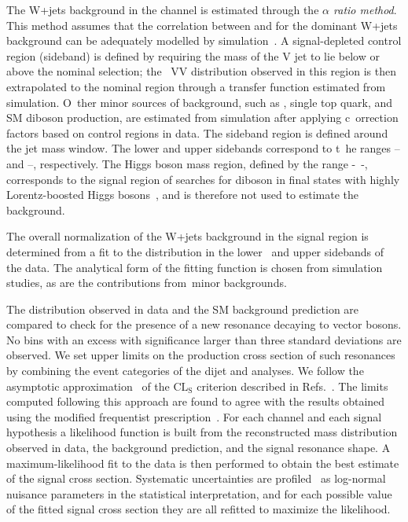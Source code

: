 The W+jets background in the \lnujet channel is estimated through the \emph{$\alpha$ ratio method}.
This method assumes that the correlation between \mJ{} and \mVV{} for the dominant W+jets background can be adequately modelled by simulation\
.
A signal-depleted control region (sideband) is defined by requiring the mass of the V jet to lie below or above the nominal selection; the \m\
VV{} distribution observed in this region is then extrapolated to the nominal region through a transfer function estimated from simulation. O\
ther minor sources of background, such as \ttbar, single top quark, and SM diboson production, are estimated from simulation after applying c\
orrection factors based on control regions in data. The sideband region is defined around the jet mass window. The lower and upper sidebands correspond to t\
he \mJ{} ranges \LOWSBLOW--\SRLOW and \HIGHSBLOW--\HIGHSBHIGH{\GeV}, respectively. The Higgs boson mass region, defined by the range \SRHIGH-\
-\HIGHSBLOW{\GeV}, corresponds to the signal region of searches for diboson in final states with highly Lorentz-boosted Higgs 
bosons~\cite{Khachatryan:2016cfx}, and is therefore not used to estimate the background.

\par The overall normalization of the W+jets background in the signal region is determined from a fit to the \mJ{} distribution in the lower \
and upper sidebands of the data. The analytical form of the fitting function is chosen from simulation studies, as are the contributions from\
 minor backgrounds. 

The \mVV{} distribution observed in data and the
SM background prediction are compared to check for the presence of a
new resonance decaying to vector bosons.
No bins with an excess with significance larger than three standard deviations are observed.
We set upper limits on the
production cross section of such resonances by combining the event categories of
the dijet and \lnujet analyses.
We follow the asymptotic approximation~\cite{AsymptCLs} of the $\mathrm{CL_S}$ criterion described in Refs.~\cite{CLs1,Junk:1999kv}.
The limits computed following this approach are found to agree with the results obtained using the modified frequentist 
prescription~\cite{CLs1,Junk:1999kv}.
For each channel and each signal hypothesis a likelihood function is built from the reconstructed \mVV mass distribution observed in data, 
the background prediction, and the
signal resonance shape. A maximum-likelihood fit to the data is then performed to obtain the best estimate of the signal cross section.
Systematic uncertainties are profiled~\cite{Aad:2015zhl} as log-normal nuisance parameters in the statistical interpretation,
and for each possible value of the fitted signal cross section they are all refitted to maximize the likelihood.

